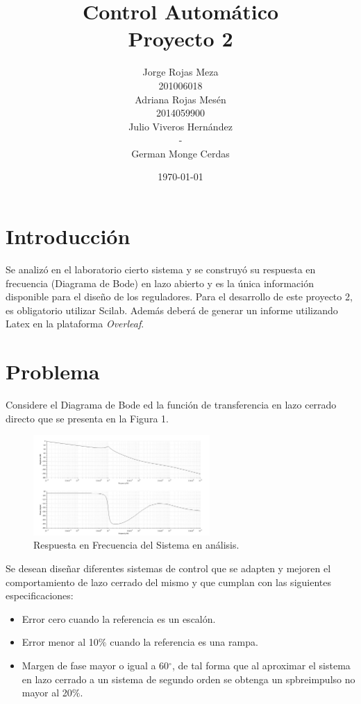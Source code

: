 \documentclass[12pt,letterpaper]{article}
\begin{document}
\title{Control Automático\\Proyecto 2}

\author{Jorge Rojas Meza\\201006018\\Adriana Rojas Mesén\\2014059900\\Julio Viveros Hernández\\-\\German Monge Cerdas}
\date{\today}
\maketitle
\section{Introducción}
Se analizó en el laboratorio cierto sistema y se construyó su respuesta en frecuencia (Diagrama de Bode) en lazo abierto y es la única información disponible para el diseño de los reguladores. Para el desarrollo de este proyecto 2, es obligatorio utilizar Scilab. Además deberá de generar un informe utilizando Latex en la plataforma \textit{Overleaf}.

\section{Problema}

Considere el Diagrama de Bode ed la función de transferencia en lazo cerrado directo que se presenta en la Figura 1.\\
\begin{figure}
  \centering
    \includegraphics[width=0.6\textwidth]{Figura1.jpg}
  \caption{Respuesta en Frecuencia del Sistema en análisis.}
  \label{fig:ejemplo}
\end{figure}

Se desean diseñar diferentes sistemas de control que se adapten y mejoren el comportamiento de lazo cerrado del mismo y que cumplan con las siguientes especificaciones:

\begin{itemize}
    \item Error cero cuando la referencia es un escalón.
    \item Error menor al 10$\%$ cuando la referencia es una rampa.
    \item Margen de fase mayor o igual a 60$^\circ$, de tal forma que al aproximar el sistema en lazo cerrado a un sistema de segundo orden se obtenga un spbreimpulso no mayor al 20$\%$.
\end{itemize}
\end{document}
